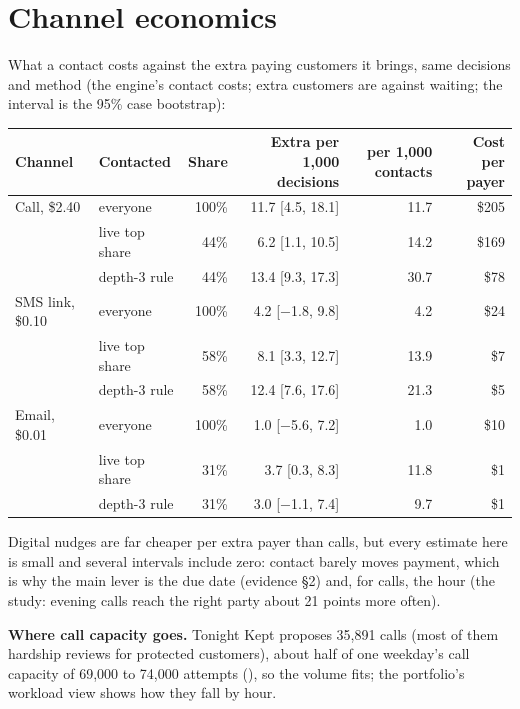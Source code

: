 \documentclass[11pt]{article}
\begin{document}
\section{Channel economics}

What a contact costs against the extra paying customers it brings, same decisions and method (the engine's contact costs; extra
customers are against waiting; the interval is the 95\% case bootstrap):

\begin{center}\footnotesize
\begin{tabular}{@{}llrrrr@{}}
\toprule
\textbf{Channel} & \textbf{Contacted} & \textbf{Share} & \textbf{Extra per 1,000 decisions} & \textbf{per 1,000 contacts} & \textbf{Cost per payer} \\
\midrule
Call, \$2.40 & everyone & 100\% & 11.7 [4.5, 18.1] & 11.7 & \$205 \\
 & live top share & 44\% & 6.2 [1.1, 10.5] & 14.2 & \$169 \\
 & depth-3 rule & 44\% & 13.4 [9.3, 17.3] & 30.7 & \$78 \\
SMS link, \$0.10 & everyone & 100\% & 4.2 [$-$1.8, 9.8] & 4.2 & \$24 \\
 & live top share & 58\% & 8.1 [3.3, 12.7] & 13.9 & \$7 \\
 & depth-3 rule & 58\% & 12.4 [7.6, 17.6] & 21.3 & \$5 \\
Email, \$0.01 & everyone & 100\% & 1.0 [$-$5.6, 7.2] & 1.0 & \$10 \\
 & live top share & 31\% & 3.7 [0.3, 8.3] & 11.8 & \$1 \\
 & depth-3 rule & 31\% & 3.0 [$-$1.1, 7.4] & 9.7 & \$1 \\
\bottomrule
\end{tabular}
\end{center}

Digital nudges are far cheaper per extra payer than calls, but every estimate here is small and several intervals include zero:
contact barely moves payment, which is why the main lever is the due date (evidence §2) and, for calls, the hour (the study:
evening calls reach the right party about 21 points more often).

\textbf{Where call capacity goes.} Tonight Kept proposes 35,891 calls (most of them hardship reviews for protected customers), about half of one weekday's
call capacity of 69,000 to 74,000 attempts (), so the volume fits; the portfolio's
workload view shows how they fall by hour.
\end{document}
